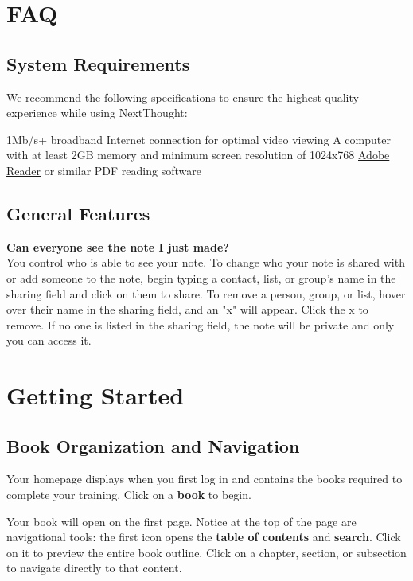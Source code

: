 \chapter{FAQ}
\label{chapter:FAQ}

\section{System Requirements}
\label{section:System Requirements}

We recommend the following specifications to ensure the highest quality experience while using NextThought:

1Mb/s+ broadband Internet connection for optimal video viewing
A computer with at least 2GB memory and minimum screen resolution of 1024x768
\href{http://get.adobe.com/reader/}{Adobe Reader} or similar PDF reading software

\section{General Features}
\label{section:General_Features}

\textbf{Can everyone see the note I just made?}\\

You control who is able to see your note. To change who your note is shared with or add someone to the note, begin typing a contact, list, or group's name in the sharing field and click on them to share. To remove a person, group, or list, hover over their name in the sharing field, and an "x" will appear. Click the x to remove. If no one is listed in the sharing field, the note will be private and only you can access it.

\chapter{Getting Started}
\label{chapter:Getting_Started}

\section{Book Organization and Navigation}
\label{section:Book_Organization_and_Navigation}

Your homepage displays when you first log in and contains the books required to complete your training. Click on a \textbf{book} to begin.

Your book will open on the first page. Notice at the top of the page are navigational tools: the first icon opens the \textbf{table of contents} and \textbf{search}. Click on it to preview the entire book outline. Click on a chapter, section, or subsection to navigate directly to that content. 